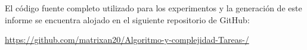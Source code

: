 El código fuente completo utilizado para los experimentos y la generación de este informe se encuentra alojado en el siguiente repositorio de GitHub:

\url{https://github.com/matrixan20/Algoritmo-y-complejidad-Tareas-/}
